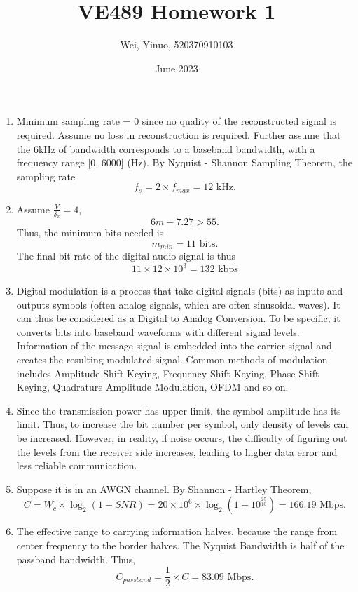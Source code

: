 \documentclass{article}
\title{VE489 Homework 1}
\author{Wei, Yinuo, 520370910103}
\date{June 2023}
\begin{document}
\maketitle

\begin{enumerate}
    \item
    Minimum sampling rate = 0 since no quality of the reconstructed signal is required.
    \newline
    Assume no loss in reconstruction is required. Further assume that the 6kHz of bandwidth corresponds to a baseband bandwidth, with a frequency range [0, 6000] (Hz). By Nyquist - Shannon Sampling Theorem, the sampling rate
    $$f_s=2\times f_{max}=12 \text{ kHz}.$$
    
    \item
    Assume $\frac{V}{\delta_x}=4$, $$6m-7.27>55.$$ Thus, the minimum bits needed is $$m_{min}=11 \text{ bits}.$$
    The final bit rate of the digital audio signal is thus
    $$11\times 12\times 10^{3} = 132 \text{ kbps}$$
    \item Digital modulation is a process that take digital signals (bits) as inputs and outputs symbols (often analog signals, which are often sinusoidal waves).
    It can thus be considered as a Digital to Analog Conversion. 
    To be specific, it converts bits into baseband waveforms with different signal levels. Information of the message signal is embedded into the carrier signal and creates the resulting modulated signal.
    Common methods of modulation includes Amplitude Shift Keying, Frequency Shift Keying, Phase Shift Keying, Quadrature Amplitude Modulation, OFDM and so on.
    
    \item Since the transmission power has upper limit, the symbol amplitude has its limit. Thus, to increase the bit number per symbol, only density of levels can be increased. However, in reality, if noise occurs, the difficulty of figuring out the levels from the receiver side increases, leading to higher data error and less reliable communication. 
    
    \item 
    Suppose it is in an AWGN channel. By Shannon - Hartley Theorem,
    $$C=W_c\times \log _2 (1+SNR) = 20 \times 10^6 \times \log _2(1+10^{\frac{25}{10}})=166.19 \text{ Mbps}.$$
    \item
    The effective range to carrying information halves, because the range from center frequency to the border halves.
    The Nyquist Bandwidth is half of the passband bandwidth. Thus,
    $$C_{passband}=\frac{1}{2}\times C= 83.09\text{ Mbps}.$$
    

\end{enumerate}
\end{document}
